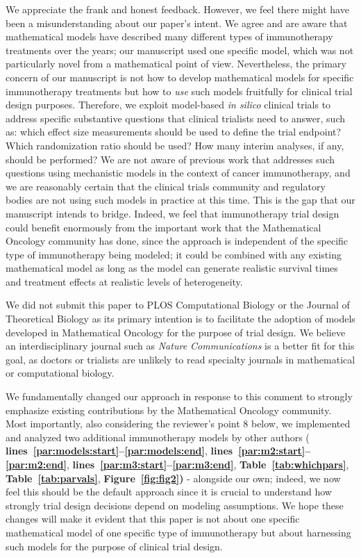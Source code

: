 \documentclass{article}
\newcommand{\auth}[1]{{#1}}
\newcommand{\chng}[1]{{\color{blue!70!black} #1}}
\newcommand{\myref}[2]{{\bfseries\color{red!70!black} Figure~\ref{#1}#2}}
\newcommand{\mytref}[1]{{\bfseries\color{red!70!black} Table~\ref{#1}}}
\newcommand{\lr}[1]{{\bfseries\color{red!70!black} lines~\ref{#1:start}--\ref{#1:end}}}
\begin{document}
\auth{We appreciate the frank and honest feedback. However, we feel there might have been a misunderstanding about our paper's intent. We agree and are aware that mathematical models have described many different types of immunotherapy treatments over the years; our manuscript used one specific model, which was not particularly novel from a mathematical point of view. Nevertheless, the primary concern of our manuscript is not how to develop mathematical models for specific immunotherapy treatments but how to \emph{use} such models fruitfully for clinical trial design purposes. Therefore, we exploit model-based \emph{in silico} clinical trials to address specific substantive questions that clinical trialists need to answer, such as: which effect size measurements should be used to define the trial endpoint? Which randomization ratio should be used? How many interim analyses, if any, should be performed? We are not aware of previous work that addresses such questions using mechanistic models in the context of cancer immunotherapy, and we are reasonably certain that the clinical trials community and regulatory bodies are not using such models in practice at this time. This is the gap that our manuscript intends to bridge. Indeed, we feel that immunotherapy trial design could benefit enormously from the important work that the Mathematical Oncology community has done, since the approach is independent of the specific type of immunotherapy being modeled; it could be combined with any existing mathematical model as long as the model can generate realistic survival times and treatment effects at realistic levels of heterogeneity.

We did not submit this paper to PLOS Computational Biology or the Journal of Theoretical Biology as its primary intention is to facilitate the adoption of models developed in Mathematical Oncology for the purpose of trial design. We believe an interdisciplinary journal such as \emph{Nature Communications} is a better fit for this goal, as doctors or trialists are unlikely to read specialty journals in mathematical or computational biology.}

\chng{We fundamentally changed our approach in response to this comment to strongly emphasize existing contributions by the Mathematical Oncology community. Most importantly, also considering the reviewer's point 8 below, we implemented and analyzed two additional immunotherapy models by other authors (\lr{par:models}, \lr{par:m2}, \lr{par:m3}, \mytref{tab:whichpars}, \mytref{tab:parvals}, \myref{fig:fig2}) - alongside our own; indeed, we now feel this should be the default approach since it is crucial to understand how strongly trial design decisions depend on modeling assumptions. We hope these changes will make it evident that this paper is not about one specific mathematical model of one specific type of immunotherapy but about harnessing such models for the purpose of clinical trial design.}
\end{document}
